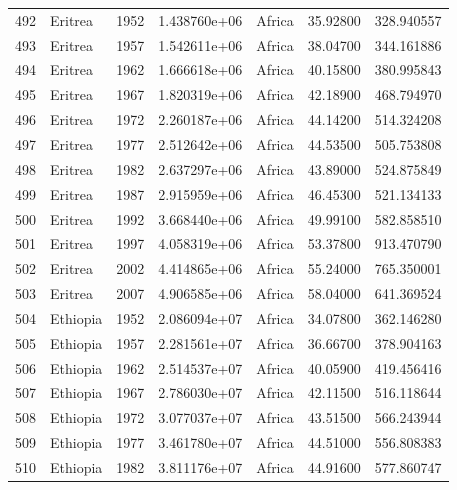 \documentclass[
  letterpaper,
  DIV=11,
  numbers=noendperiod]{scrreprt}
\begin{document}
\begin{tabular}{llrrlrr}
492  &                   Eritrea &  1952 &  1.438760e+06 &    Africa &  35.92800 &     328.940557 \\
493  &                   Eritrea &  1957 &  1.542611e+06 &    Africa &  38.04700 &     344.161886 \\
494  &                   Eritrea &  1962 &  1.666618e+06 &    Africa &  40.15800 &     380.995843 \\
495  &                   Eritrea &  1967 &  1.820319e+06 &    Africa &  42.18900 &     468.794970 \\
496  &                   Eritrea &  1972 &  2.260187e+06 &    Africa &  44.14200 &     514.324208 \\
497  &                   Eritrea &  1977 &  2.512642e+06 &    Africa &  44.53500 &     505.753808 \\
498  &                   Eritrea &  1982 &  2.637297e+06 &    Africa &  43.89000 &     524.875849 \\
499  &                   Eritrea &  1987 &  2.915959e+06 &    Africa &  46.45300 &     521.134133 \\
500  &                   Eritrea &  1992 &  3.668440e+06 &    Africa &  49.99100 &     582.858510 \\
501  &                   Eritrea &  1997 &  4.058319e+06 &    Africa &  53.37800 &     913.470790 \\
502  &                   Eritrea &  2002 &  4.414865e+06 &    Africa &  55.24000 &     765.350001 \\
503  &                   Eritrea &  2007 &  4.906585e+06 &    Africa &  58.04000 &     641.369524 \\
504  &                  Ethiopia &  1952 &  2.086094e+07 &    Africa &  34.07800 &     362.146280 \\
505  &                  Ethiopia &  1957 &  2.281561e+07 &    Africa &  36.66700 &     378.904163 \\
506  &                  Ethiopia &  1962 &  2.514537e+07 &    Africa &  40.05900 &     419.456416 \\
507  &                  Ethiopia &  1967 &  2.786030e+07 &    Africa &  42.11500 &     516.118644 \\
508  &                  Ethiopia &  1972 &  3.077037e+07 &    Africa &  43.51500 &     566.243944 \\
509  &                  Ethiopia &  1977 &  3.461780e+07 &    Africa &  44.51000 &     556.808383 \\
510  &                  Ethiopia &  1982 &  3.811176e+07 &    Africa &  44.91600 &     577.860747 \\

\end{tabular}
\end{document}
